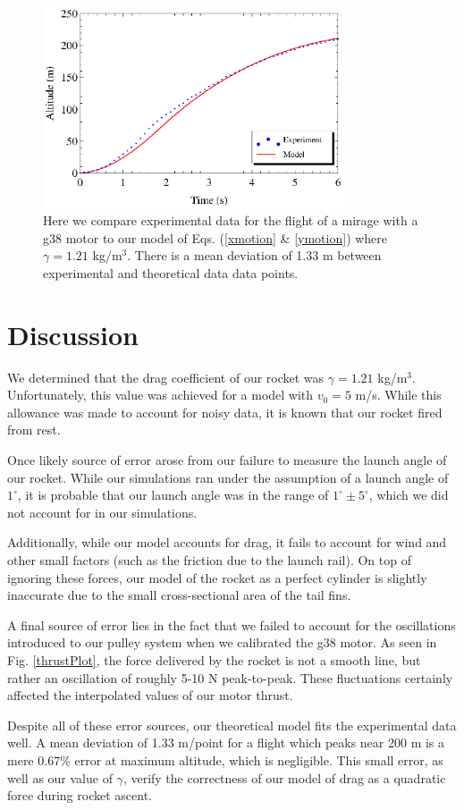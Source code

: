 \documentclass[aps,pra,twocolumn]{revtex4-1}
\begin{document}
\begin{figure} [t!]
	\includegraphics[width=3.5in]{Mirage-G38-BestFit.eps}
	\caption{Here we compare experimental data for the flight of a mirage with a g38 motor to our model of Eqs. (\ref{xmotion} \& \ref{ymotion}) where $\gamma = 1.21$ kg/m$^3$.  There is a mean deviation of 1.33 m between experimental and theoretical data data points.  \label{experiment}}
\end{figure}


\section{\label{section 5} Discussion}
We determined that the drag coefficient of our rocket was $\gamma = 1.21$ kg/m$^3$.  Unfortunately, this value was achieved for a model with $ v_ 0 = 5$ m/s.  While this allowance was made to account for noisy data, it is known that our rocket fired from rest. 

Once likely source of error arose from our failure to measure the launch angle of our rocket.  While our simulations ran under the assumption of a launch angle of $1^\circ$, it is probable that our launch angle was in the range of $1^\circ \pm 5^\circ$, which we did not account for in our simulations.

Additionally, while our model accounts for drag, it fails to account for wind and other small factors (such as the friction due to the launch rail).  On top of ignoring these forces, our model of the rocket as a perfect cylinder is slightly inaccurate due to the small cross-sectional area of the tail fins.

A final source of error lies in the fact that we failed to account for the oscillations introduced to our pulley system when we calibrated the g38 motor.   As seen in Fig. \ref{thrustPlot}, the force delivered by the rocket is not a smooth line, but rather an oscillation of roughly 5-10 N peak-to-peak.  These fluctuations certainly affected the interpolated values of our motor thrust.

Despite all of these error sources, our theoretical model fits the experimental data well.  A mean deviation of 1.33 m/point for a flight which peaks near 200 m is a mere 0.67\% error at maximum altitude, which is negligible.  This small error, as well as our value of $\gamma$, verify the correctness of our model of drag as a quadratic force during rocket ascent.


\end{document}
